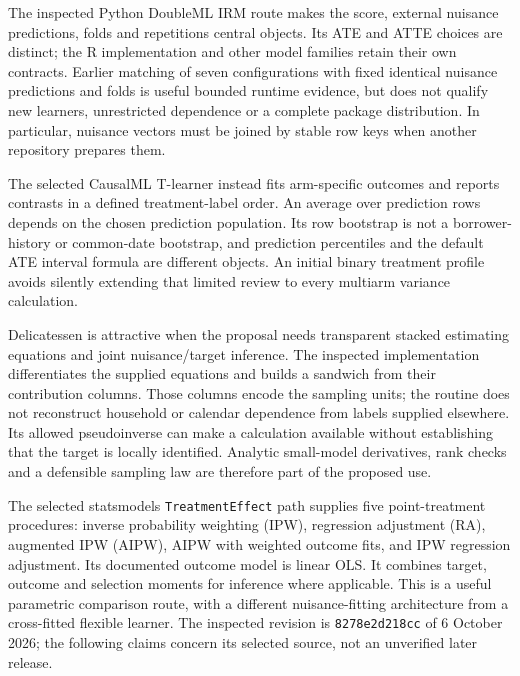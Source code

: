 The inspected Python DoubleML IRM route makes the score, external nuisance
predictions, folds and repetitions central objects. Its ATE and ATTE choices
are distinct; the R implementation and other model families retain their
own contracts. Earlier matching of seven configurations with fixed identical
nuisance predictions and folds is useful bounded runtime evidence, but does
not qualify new learners, unrestricted dependence or a complete package
distribution. In particular, nuisance vectors must be joined by stable row
keys when another repository prepares them.~\citep{runtime_doubleml_scope}

The selected CausalML T-learner instead fits arm-specific outcomes and reports
contrasts in a defined treatment-label order. An average over prediction rows
depends on the chosen prediction population. Its row bootstrap is not a
borrower-history or common-date bootstrap, and prediction percentiles and
the default ATE interval formula are different objects. An initial binary
treatment profile avoids silently extending that limited review to every
multiarm variance calculation.~\citep{exec14_causalml_primary}

Delicatessen is attractive when the proposal needs transparent stacked
estimating equations and joint nuisance/target inference. The inspected
implementation differentiates the supplied equations and builds a sandwich
from their contribution columns. Those columns encode the sampling units;
the routine does not reconstruct household or calendar dependence from
labels supplied elsewhere. Its allowed pseudoinverse can make a calculation
available without establishing that the target is locally identified.
Analytic small-model derivatives, rank checks and a defensible sampling law
are therefore part of the proposed use.~\citep{v13_sw_delicatessen,v131_sw_delicatessen}

The selected statsmodels \texttt{TreatmentEffect} path supplies five
point-treatment procedures: inverse probability weighting (IPW), regression
adjustment (RA), augmented IPW (AIPW), AIPW with weighted outcome fits, and
IPW regression adjustment. Its documented outcome model is linear OLS.
It combines target, outcome and selection moments for inference where
applicable. This is a useful parametric comparison route, with a different
nuisance-fitting architecture from a cross-fitted flexible learner.
The inspected revision is \texttt{8278e2d218cc} of 6 October 2026; the
following claims concern its selected source, not an unverified later
release.~\citep{v13_sw_statsmodels,exec20_python_effect_source}

